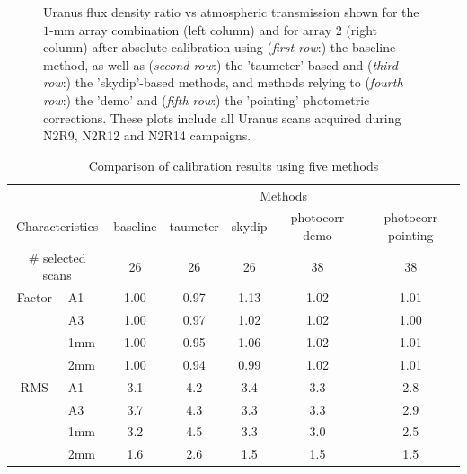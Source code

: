 \begin{figure}[ht!]
\begin{center}
  \caption[Uranus flux density stability against atmospheric
    transmission]{Uranus flux density ratio vs atmospheric transmission
    shown for the $1$-mm array
    combination (left column) and for array 2 (right column) after absolute
    calibration using (\emph{first row}:) the baseline method, as
    well as (\emph{second row}:) the 'taumeter'-based and
    (\emph{third row}:) the 'skydip'-based methods, and methods
    relying to (\emph{fourth row}:) the 'demo' and (\emph{fifth
      row}:) the 'pointing' photometric corrections. These plots
    include all Uranus scans acquired during N2R9, N2R12 and N2R14
    campaigns. }
  \label{fig:calib_uranus_vs_atmtrans_all}
\end{center}
\end{figure}



\begin{table}[th]
\begin{center}
\begin{tabular}{|c|l|c|c|c|c|c|}
  \hline
  \multicolumn{2}{|c|}{}  &  \multicolumn{5}{|c|}{Methods} \\\cline{3-7}
  \multicolumn{2}{|c|}{Characteristics} &  baseline  & taumeter  &  skydip  &  photocorr demo & photocorr pointing \\
  \hline\hline
   \multicolumn{2}{|c|}{$\#$ selected scans} & 26    &       26  &    26    &    38           &    38 \\ 
  \hline 
  Factor &  A1          &   1.00  &  0.97   &  1.13    &   1.02    &   1.01  \\
       &  A3            &   1.00  &  0.97   &  1.02    &   1.02    &   1.00  \\
       &  1mm           &   1.00  &  0.95   &  1.06    &   1.02    &   1.01  \\
       &  2mm           &   1.00  &  0.94   &  0.99    &   1.02    &   1.01  \\
  \hline
  RMS  &  A1            &  3.1    &   4.2   &   3.4    &    3.3    &   2.8 \\
       &  A3            &  3.7    &   4.3   &   3.3    &    3.3    &   2.9 \\
       &  1mm           &  3.2    &   4.5   &   3.3    &    3.0    &   2.5 \\
       &  2mm           &  1.6    &   2.6   &   1.5    &    1.5    &   1.5 \\
\hline\hline
\end{tabular}
\caption[Comparison of calibration results using five methods]{Comparison of calibration results using five methods}
\label{tab:Abs_calibration_results_all}
\end{center}
\end{table}





